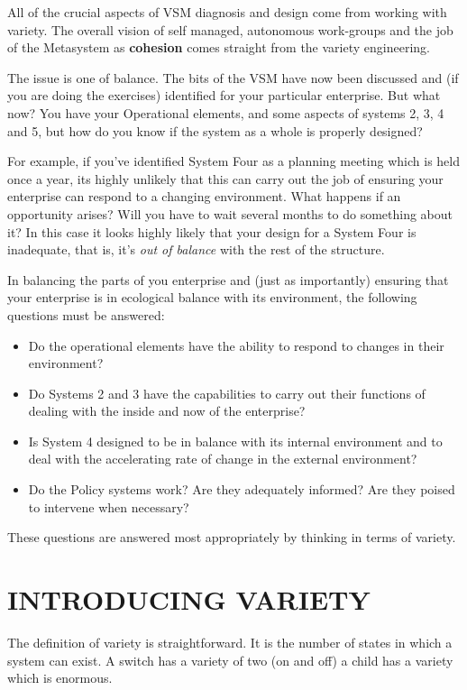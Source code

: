 All of the crucial aspects of VSM diagnosis and design come from working with variety. The overall vision of self managed, autonomous work-groups and the job of the Metasystem as \textbf{cohesion} comes straight from the variety engineering.

The issue is one of balance. The bits of the VSM have now been discussed and (if you are doing the exercises) identified for your particular enterprise. But what now? You have your Operational elements, and some aspects of systems 2, 3, 4 and 5, but how do you know if the system as a whole is properly designed?

For example, if you've identified System Four as a planning meeting which is held once a year, its highly unlikely that this can carry out the job of ensuring your enterprise can respond to a changing environment. What happens if an opportunity arises? Will you have to wait several months to do something about it? In this case it looks highly likely that your design for a System Four is inadequate, that is, it's \textit{out of balance} with the rest of the structure.

In balancing the parts of you enterprise and (just as importantly) ensuring that your enterprise is in ecological balance with its environment, the following questions must be answered:

\begin{itemize}
  \item Do the operational elements have the ability to respond to changes in their environment?

  \item Do Systems 2 and 3 have the capabilities to carry out their functions of dealing with the inside and now of the enterprise?

  \item Is System 4 designed to be in balance with its internal environment and to deal with the accelerating rate of change in the external environment?

  \item Do the Policy systems work? Are they adequately informed? Are they poised to intervene when necessary?

\end{itemize}

These questions are answered most appropriately by thinking in terms of variety.

\section*{INTRODUCING VARIETY}
The definition of variety is straightforward. It is the number of states in which a system can exist. A switch has a variety of two (on and off) a child has a variety which is enormous.


